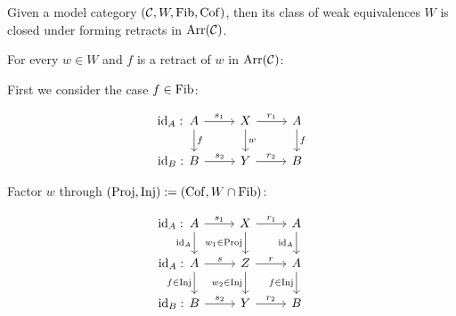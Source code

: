         \begin{prop}
            Given a model category $(\mathcal{C}, W, \mathrm{Fib}, \mathrm{Cof})$, then its
            class of weak equivalences $W$ is closed under forming retracts in $\operatorname{\rm{Arr}}(\mathcal{C})$.
        \end{prop}
        \begin{prf}
            \par For every $w \in W$ and $f$ is a retract of $w$ in $\operatorname{\rm{Arr}}(\mathcal{C})$:
            \par First we consider the case $f \in \mathrm{Fib}$:

            \[\begin{tikzcd}
                A & X & A \\
                B & Y & B
                \arrow["{w}", from=1-2, to=2-2]
                \arrow["r_1", from=1-2, to=1-3]
                \arrow["r_2", from=2-2, to=2-3]
                \arrow["\id_A : \hspace*{2.77cm}"{marking}, "s_1", from=1-1, to=1-2]
                \arrow["\id_B : \hspace*{2.77cm}"{marking}, "s_2",from=2-1, to=2-2]
                \arrow["f", from=1-1, to=2-1]
                \arrow["f", from=1-3, to=2-3]
            \end{tikzcd}\]

            \par Factor $w$ through $(\operatorname{\rm{Proj}}, \operatorname{\rm{Inj}}) := (\mathrm{Cof}, W \cap \mathrm{Fib})$:

            \[\begin{tikzcd}
                A & X & A \\
                A & Z & A \\
                B & Y & B
                \arrow["\id_B : \hspace*{2.77cm}"{marking}, "{s_2}", from=3-1, to=3-2]
                \arrow["{r_2}", from=3-2, to=3-3]
                \arrow["f \in \Inj"', from=2-3, to=3-3]
                \arrow["{w_2 \in \Inj}"', from=2-2, to=3-2]
                \arrow["{w_1 \in \Proj}"', from=1-2, to=2-2]
                \arrow["\id_A"', from=1-3, to=2-3]
                \arrow["\id_A"', from=1-1, to=2-1]
                \arrow["f \in \Inj"', from=2-1, to=3-1]
                \arrow["\id_A : \hspace*{2.77cm}"{marking}, "{s_1}", from=1-1, to=1-2]
                \arrow["{r_1}", from=1-2, to=1-3]
                \arrow["\id_A : \hspace*{2.77cm}"{marking}, "s", from=2-1, to=2-2]
                \arrow["r", from=2-2, to=2-3]
            \end{tikzcd}\]
            


\end{prf}
